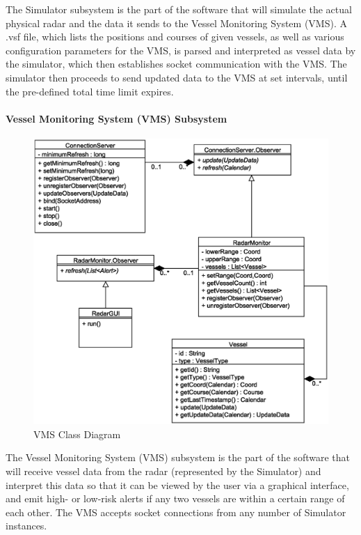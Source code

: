 \documentclass{article}
\begin{document}
The Simulator subsystem is the part of the software that will simulate the actual physical radar and the data it sends to the Vessel Monitoring System (VMS). A .vsf file, which lists the positions and courses of given vessels, as well as various configuration parameters for the VMS, is parsed and interpreted as vessel data by the simulator, which then establishes socket communication with the VMS. The simulator then proceeds to send updated data to the VMS at set intervals, until the pre-defined total time limit expires.

\break

\paragraph{Vessel Monitoring System (VMS) Subsystem}

\begin{figure}[!htb]
\caption{VMS Class Diagram}
\centering
\includegraphics[scale=0.6]{diagrams/vms-class-diagram.eps}
\end{figure}

The Vessel Monitoring System (VMS) subsystem is the part of the software that will receive vessel data from the radar (represented by the Simulator) and interpret this data so that it can be viewed by the user via a graphical interface, and emit high- or low-risk alerts if any two vessels are within a certain range of each other. The VMS accepts socket connections from any number of Simulator instances.
\end{document}
